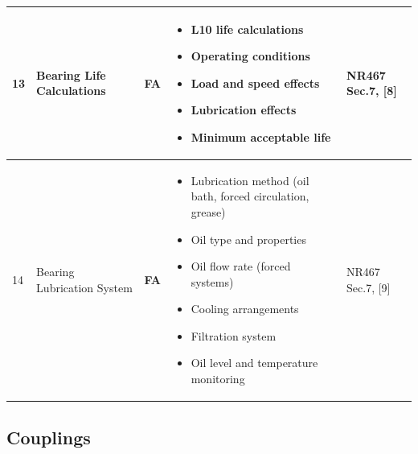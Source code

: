 \documentclass[11pt,a4paper]{report}
\newcommand{\fa}{\textbf{\textcolor{warningred}{FA}}}
\begin{document}
\begin{longtable}{|p{0.5cm}|p{5cm}|p{1.5cm}|p{5.5cm}|p{2cm}|}
13 & Bearing Life Calculations & \fa{} & 
\begin{itemize}[leftmargin=*,nosep]
\item L10 life calculations
\item Operating conditions
\item Load and speed effects
\item Lubrication effects
\item Minimum acceptable life
\end{itemize} & NR467 Sec.7, [8] \\
\hline

14 & Bearing Lubrication System & \fa{} & 
\begin{itemize}[leftmargin=*,nosep]
\item Lubrication method (oil bath, forced circulation, grease)
\item Oil type and properties
\item Oil flow rate (forced systems)
\item Cooling arrangements
\item Filtration system
\item Oil level and temperature monitoring
\end{itemize} & NR467 Sec.7, [9] \\
\hline

\end{longtable}

\subsection{Couplings}
\end{document}
